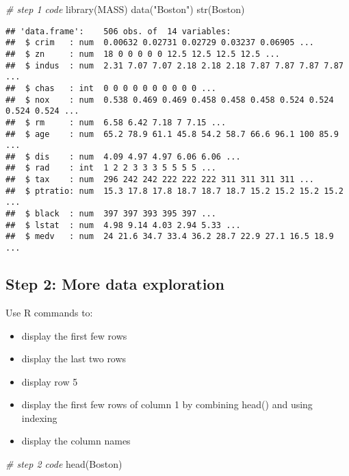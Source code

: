 \documentclass[
]{article}
\newenvironment{Shaded}{\begin{snugshade}}{\end{snugshade}}
\newcommand{\CommentTok}[1]{\textcolor[rgb]{0.56,0.35,0.01}{\textit{#1}}}
\newcommand{\FunctionTok}[1]{\textcolor[rgb]{0.00,0.00,0.00}{#1}}
\newcommand{\NormalTok}[1]{#1}
\newcommand{\StringTok}[1]{\textcolor[rgb]{0.31,0.60,0.02}{#1}}
\providecommand{\tightlist}{%
  \setlength{\itemsep}{0pt}\setlength{\parskip}{0pt}}
\begin{document}
\begin{Shaded}
\begin{Highlighting}[]
\CommentTok{\# step 1 code}
\FunctionTok{library}\NormalTok{(MASS)}
\FunctionTok{data}\NormalTok{(}\StringTok{"Boston"}\NormalTok{)}
\FunctionTok{str}\NormalTok{(Boston)}
\end{Highlighting}
\end{Shaded}

\begin{verbatim}
## 'data.frame':    506 obs. of  14 variables:
##  $ crim   : num  0.00632 0.02731 0.02729 0.03237 0.06905 ...
##  $ zn     : num  18 0 0 0 0 0 12.5 12.5 12.5 12.5 ...
##  $ indus  : num  2.31 7.07 7.07 2.18 2.18 2.18 7.87 7.87 7.87 7.87 ...
##  $ chas   : int  0 0 0 0 0 0 0 0 0 0 ...
##  $ nox    : num  0.538 0.469 0.469 0.458 0.458 0.458 0.524 0.524 0.524 0.524 ...
##  $ rm     : num  6.58 6.42 7.18 7 7.15 ...
##  $ age    : num  65.2 78.9 61.1 45.8 54.2 58.7 66.6 96.1 100 85.9 ...
##  $ dis    : num  4.09 4.97 4.97 6.06 6.06 ...
##  $ rad    : int  1 2 2 3 3 3 5 5 5 5 ...
##  $ tax    : num  296 242 242 222 222 222 311 311 311 311 ...
##  $ ptratio: num  15.3 17.8 17.8 18.7 18.7 18.7 15.2 15.2 15.2 15.2 ...
##  $ black  : num  397 397 393 395 397 ...
##  $ lstat  : num  4.98 9.14 4.03 2.94 5.33 ...
##  $ medv   : num  24 21.6 34.7 33.4 36.2 28.7 22.9 27.1 16.5 18.9 ...
\end{verbatim}

\hypertarget{step-2-more-data-exploration}{%
\subsection{Step 2: More data
exploration}\label{step-2-more-data-exploration}}

Use R commands to:

\begin{itemize}
\tightlist
\item
  display the first few rows
\item
  display the last two rows
\item
  display row 5
\item
  display the first few rows of column 1 by combining head() and using
  indexing
\item
  display the column names
\end{itemize}

\begin{Shaded}
\begin{Highlighting}[]
\CommentTok{\# step 2 code}
\FunctionTok{head}\NormalTok{(Boston)}
\end{Highlighting}
\end{Shaded}
\end{document}
